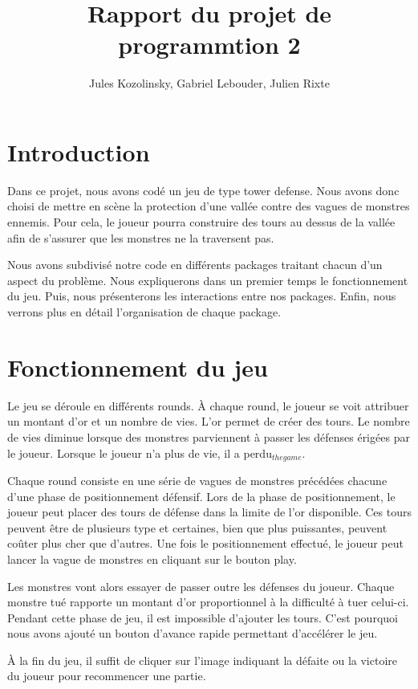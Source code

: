 \documentclass{article}
\title{Rapport du projet de programmtion 2}
\author{Jules Kozolinsky, Gabriel Lebouder, Julien Rixte}
\begin{document}
\maketitle

\section{Introduction}
Dans ce projet, nous avons codé un jeu de type tower defense. Nous avons donc choisi de mettre en scène la protection d'une vallée contre des vagues de monstres ennemis. Pour cela, le joueur pourra construire des tours au dessus de la vallée afin de s'assurer que les monstres ne la traversent pas. 
\par
Nous avons subdivisé notre code en différents packages traitant chacun d'un aspect du problème. Nous expliquerons dans un premier temps le fonctionnement du jeu. Puis, nous présenterons les interactions entre nos packages. Enfin, nous verrons plus en détail l'organisation de chaque package.

\section{Fonctionnement du jeu}
Le jeu se déroule en différents rounds. À chaque round, le joueur se voit attribuer un montant d'or et un nombre de vies. L'or permet de créer des tours. Le nombre de vies diminue lorsque des monstres parviennent à passer les défenses érigées par le joueur. Lorsque le joueur n'a plus de vie, il a perdu$_{the game}$.
\par
Chaque round consiste en une série de vagues de monstres précédées chacune d'une phase de positionnement défensif. Lors de la phase de positionnement, le joueur peut placer des tours de défense dans la limite de l'or disponible. Ces tours peuvent être de plusieurs type et certaines, bien que plus puissantes, peuvent coûter plus cher que d'autres. Une fois le positionnement effectué, le joueur peut lancer la vague de monstres en cliquant sur le bouton play.
\par
Les monstres vont alors essayer de passer outre les défenses du joueur. Chaque monstre tué rapporte un montant d'or proportionnel à la difficulté à tuer celui-ci. Pendant cette phase de jeu, il est impossible d'ajouter les tours. C'est pourquoi nous avons ajouté un bouton d'avance rapide permettant d'accélérer le jeu.
\par
À la fin du jeu, il suffit de cliquer sur l'image indiquant la défaite ou la victoire du joueur pour recommencer une partie.
\end{document}
